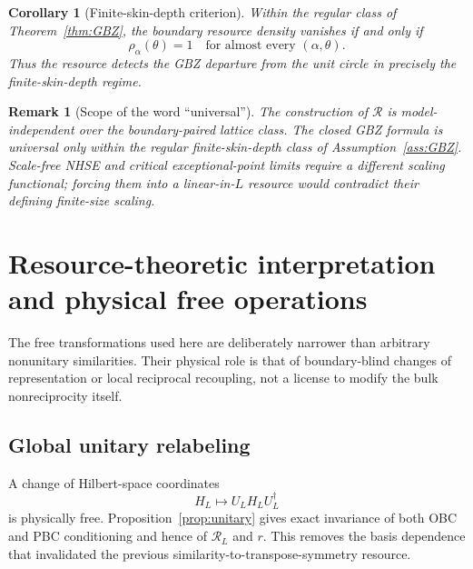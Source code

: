 \documentclass[reprint,amsmath,amssymb,aps,nofootinbib]{revtex4-2}
\newtheorem{corollary}{Corollary}
\newtheorem{remark}{Remark}
\newcommand{\Res}{\mathcal R}
\begin{document}
\begin{corollary}[Finite-skin-depth criterion]
\label{cor:GBZ-criterion}
Within the regular class of Theorem~\ref{thm:GBZ}, the boundary resource density
vanishes if and only if
\begin{equation}
\rho_\alpha(\theta)=1
\quad\text{for almost every }(\alpha,\theta).
\end{equation}
Thus the resource detects the GBZ departure from the unit circle in precisely
the finite-skin-depth regime.
\end{corollary}

\begin{remark}[Scope of the word ``universal'']
The construction of \(\Res\) is model-independent over the boundary-paired
lattice class. The closed GBZ formula is universal only within the regular
finite-skin-depth class of Assumption~\ref{ass:GBZ}. Scale-free NHSE and
critical exceptional-point limits require a different scaling functional;
forcing them into a linear-in-$L$ resource would contradict their defining
finite-size scaling.
\end{remark}

\section{Resource-theoretic interpretation and physical free operations}
\label{sec:free}

The free transformations used here are deliberately narrower than arbitrary
nonunitary similarities. Their physical role is that of boundary-blind changes
of representation or local reciprocal recoupling, not a license to modify the
bulk nonreciprocity itself.

\subsection{Global unitary relabeling}
A change of Hilbert-space coordinates
\begin{equation}
H_L\mapsto U_LH_LU_L^\dagger
\end{equation}
is physically free. Proposition~\ref{prop:unitary} gives exact invariance of
both OBC and PBC conditioning and hence of \(\mathcal R_L\) and $r$.
This removes the basis dependence that invalidated the previous
similarity-to-transpose-symmetry resource.
\end{document}
